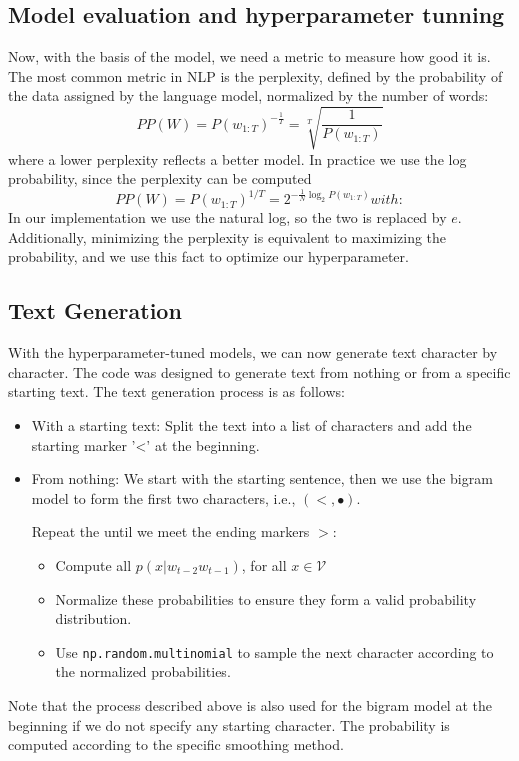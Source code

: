 \subsection{Model evaluation and hyperparameter tunning}
Now, with the basis of the model, we need a metric to measure how good it is. The most common metric in NLP is the perplexity, defined by the probability of the data assigned by the language model, normalized by the number of words:
\begin{equation}
    PP(W) = P(w_{1:T})^{-\frac{1}{T}} = \sqrt[T]{\frac{1}{P(w_{1:T})}}
\end{equation}
where a lower perplexity reflects a better model.
In practice we use the log probability, since the perplexity can be computed \begin{equation}
    PP(W) = P(w_{1:T})^{1/T} = 2^{-\frac{1}{N}\log_2 P(w_{1:T})}
with:\end{equation}
In our implementation we use the natural log, so the two is replaced by $e$.
Additionally, minimizing the perplexity is equivalent to maximizing the probability, and we use this fact to optimize our hyperparameter.
\subsection{Text Generation}
With the hyperparameter-tuned models, we can now generate text character by character. The code was designed to generate text from nothing or from a specific starting text. The text generation process is as follows:
\begin{itemize}
\item With a starting text: Split the text into a list of characters and add the starting marker '<' at the beginning.
\item From nothing: We start with the starting sentence, then we use the bigram model to form the first two characters, i.e., $(<, \bullet)$.

Repeat the until we meet the ending markers $>$:
\begin{itemize}
\item Compute all $p(x|w_{t-2}w_{t-1})$, for all $x\in\mathcal{V}$
\item Normalize these probabilities to ensure they form a valid probability distribution.
\item Use \texttt{np.random.multinomial} to sample the next character according to the normalized probabilities.
\end{itemize}
\end{itemize}
Note that the process described above is also used for the bigram model at the beginning if we do not specify any starting character.
The probability is computed according to the specific smoothing method.


